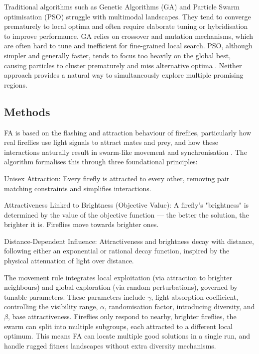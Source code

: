 \documentclass[a4paper, 12pt]{extarticle}
\begin{document}
Traditional algorithms such as Genetic Algorithms (GA) and Particle Swarm optimisation (PSO) struggle with multimodal landscapes. They tend to converge prematurely to local optima and often require elaborate tuning or hybridisation to improve performance. GA relies on crossover and mutation mechanisms, which are often hard to tune and inefficient for fine-grained local search. PSO, although simpler and generally faster, tends to focus too heavily on the global best, causing particles to cluster prematurely and miss alternative optima \cite{yang2009firefly}. Neither approach provides a natural way to simultaneously explore multiple promising regions. 

\subsection{Methods}

FA is based on the flashing and attraction behaviour of fireflies, particularly how real fireflies use light signals to attract mates and prey, and how these interactions naturally result in swarm-like movement and synchronisation \cite{yang2009firefly}. The algorithm formalises this through three foundational principles: 

Unisex Attraction: Every firefly is attracted to every other, removing pair matching constraints and simplifies interactions. 

Attractiveness Linked to Brightness (Objective Value): A firefly’s "brightness" is determined by the value of the objective function — the better the solution, the brighter it is. Fireflies move towards brighter ones. 

Distance-Dependent Influence: Attractiveness and brightness decay with distance, following either an exponential or rational decay function, inspired by the physical attenuation of light over distance. 

The movement rule integrates local exploitation (via attraction to brighter neighbours) and global exploration (via random perturbations), governed by tunable parameters. These parameters include $\gamma$, light absorption coefficient, controlling the visibility range, $\alpha$, randomisation factor, introducing diversity, and $\beta$, base attractiveness. Fireflies only respond to nearby, brighter fireflies, the swarm can split into multiple subgroups, each attracted to a different local optimum. This means FA can locate multiple good solutions in a single run,  and handle rugged fitness landscapes without extra diversity mechanisms. 
\end{document}
